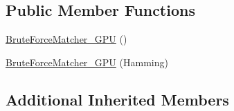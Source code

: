 \subsection*{Public Member Functions}
\begin{DoxyCompactItemize}
\item 
\hyperlink{classcv_1_1gpu_1_1BruteForceMatcher__GPU_3_01Hamming_01_4_a50f6aba558bf3062055a4a4afadc01f9}{Brute\-Force\-Matcher\-\_\-\-G\-P\-U} ()
\item 
\hyperlink{classcv_1_1gpu_1_1BruteForceMatcher__GPU_3_01Hamming_01_4_a2a1ef8dabae13e33be6869ece39f7125}{Brute\-Force\-Matcher\-\_\-\-G\-P\-U} (Hamming)
\end{DoxyCompactItemize}
\subsection*{Additional Inherited Members}


